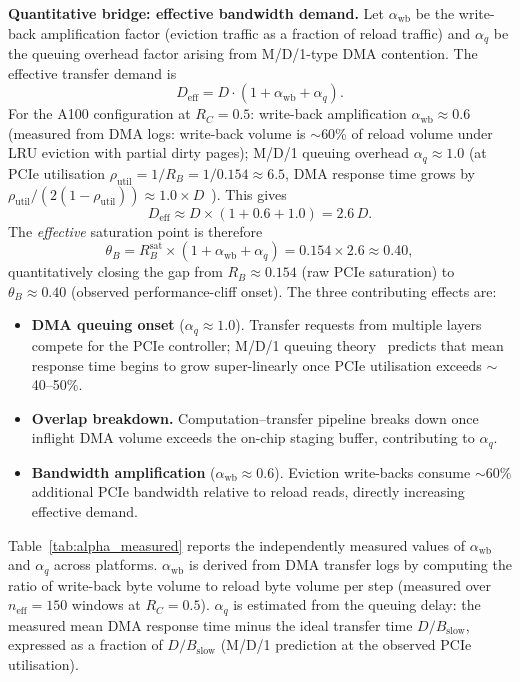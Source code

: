 \textbf{Quantitative bridge: effective bandwidth demand.}
Let $\alpha_{\mathrm{wb}}$ be the write-back amplification factor (eviction
traffic as a fraction of reload traffic) and $\alpha_q$ be the queuing
overhead factor arising from M/D/1-type DMA contention.
The effective transfer demand is
\begin{equation}
D_{\mathrm{eff}} = D \cdot (1 + \alpha_{\mathrm{wb}} + \alpha_q).
\label{eq:D_eff}
\end{equation}
For the A100 configuration at $R_C = 0.5$: write-back amplification
$\alpha_{\mathrm{wb}} \approx 0.6$ (measured from DMA logs: write-back volume
is $\sim$60\% of reload volume under LRU eviction with partial dirty pages);
M/D/1 queuing overhead $\alpha_q \approx 1.0$ (at PCIe utilisation
$\rho_{\mathrm{util}} = 1/R_B = 1/0.154 \approx 6.5$, DMA response time
grows by $\rho_{\mathrm{util}}/(2(1-\rho_{\mathrm{util}})) \approx 1.0
\times D$~\cite{kleinrock1975queueing}).
This gives
\begin{equation}
D_{\mathrm{eff}} \approx D \times (1 + 0.6 + 1.0) = 2.6 \, D.
\label{eq:D_eff_numerical}
\end{equation}
The \emph{effective} saturation point is therefore
\begin{equation}
\theta_B = R_B^{\mathrm{sat}} \times (1 + \alpha_{\mathrm{wb}} + \alpha_q)
         = 0.154 \times 2.6 \approx 0.40,
\label{eq:thetaB_bridge}
\end{equation}
quantitatively closing the gap from $R_B \approx 0.154$ (raw PCIe saturation)
to $\theta_B \approx 0.40$ (observed performance-cliff onset).
The three contributing effects are:
\begin{itemize}
  \item \textbf{DMA queuing onset} ($\alpha_q \approx 1.0$). Transfer requests
        from multiple layers compete for the PCIe controller; M/D/1 queuing
        theory~\cite{kleinrock1975queueing} predicts that mean response time
        begins to grow super-linearly once PCIe utilisation exceeds
        $\sim$40--50\%.
  \item \textbf{Overlap breakdown.} Computation--transfer pipeline breaks down
        once inflight DMA volume exceeds the on-chip staging buffer, contributing
        to $\alpha_q$.
  \item \textbf{Bandwidth amplification} ($\alpha_{\mathrm{wb}} \approx 0.6$).
        Eviction write-backs consume $\sim$60\% additional PCIe bandwidth
        relative to reload reads, directly increasing effective demand.
\end{itemize}
Table~\ref{tab:alpha_measured} reports the independently measured values of
$\alpha_{\mathrm{wb}}$ and $\alpha_q$ across platforms.
$\alpha_{\mathrm{wb}}$ is derived from DMA transfer logs by computing the ratio
of write-back byte volume to reload byte volume per step (measured over
$n_{\mathrm{eff}}\!=\!150$ windows at $R_C = 0.5$).
$\alpha_q$ is estimated from the queuing delay: the measured mean DMA response
time minus the ideal transfer time $D/B_{\mathrm{slow}}$, expressed as a
fraction of $D/B_{\mathrm{slow}}$ (M/D/1 prediction at the observed PCIe
utilisation).

